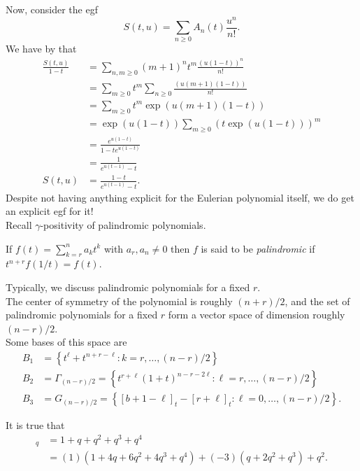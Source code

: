 	Now, consider the egf
	\[ S(t,u) = \sum_{n \ge 0} A_n(t) \frac{u^n}{n!}. \]
	We have by  that
	\begin{align*}
		\frac{S(t,u)}{1-t} &= \sum_{n,m \ge 0} (m+1)^n t^m \frac{\left(u(1-t)\right)^n}{n!} \\
			&= \sum_{m \ge 0} t^m \sum_{n \ge 0} \frac{\left(u(m+1)(1-t)\right)}{n!} \\
			&= \sum_{m \ge 0} t^m \exp(u(m+1)(1-t)) \\
			&= \exp(u(1-t)) \sum_{m \ge 0} \left( t \exp(u(1-t)) \right)^m \\
			&= \frac{e^{u(1-t)}}{1 - te^{u(1-t)}} \\
			&= \frac{1}{e^{u(t-1)} - t} \\
		S(t,u) &= \frac{1-t}{e^{u(t-1)}-t}.
	\end{align*}
	Despite not having anything explicit for the Eulerian polynomial itself, we do get an explicit egf for it!\\

	Recall $\gamma$-positivity of palindromic polynomials.

	\begin{definition}
		If $f(t) = \sum_{k=r}^n a_kt^k$ with $a_r,a_n \ne 0$ then $f$ is said to be \emph{palindromic} if $t^{n+r} f(1/t) = f(t)$.
	\end{definition}
	Typically, we discuss palindromic polynomials for a fixed $r$.\\
	The center of symmetry of the polynomial is roughly $(n+r)/2$, and the set of palindromic polynomials for a fixed $r$ form a vector space of dimension roughly $(n-r)/2$.\\
	Some bases of this space are
	\begin{align*}
		B_1 &= \left\{ t^\ell + t^{n+r-\ell} : k = r,\ldots,(n-r)/2 \right\} \\
		B_2 &= \Gamma_{(n-r)/2} = \left\{ t^{r+\ell} (1+t)^{n-r-2\ell} : \ell = r,\ldots,(n-r)/2 \right\}	\\
		B_3 &= G_{(n-r)/2} = \left\{ [b+1-\ell]_t - [r+\ell]_t : \ell = 0,\ldots,(n-r)/2 \right\}.
	\end{align*}
	
	\begin{fex}
		It is true that
		\phantom{pain}
		\begin{align*}
			[5]_q &= 1+q+q^2+q^3+q^4 \\
				&= (1)(1+4q+6q^2+4q^3+q^4) + (-3)(q+2q^2+q^3) + q^2.
		\end{align*}
	\end{fex}

